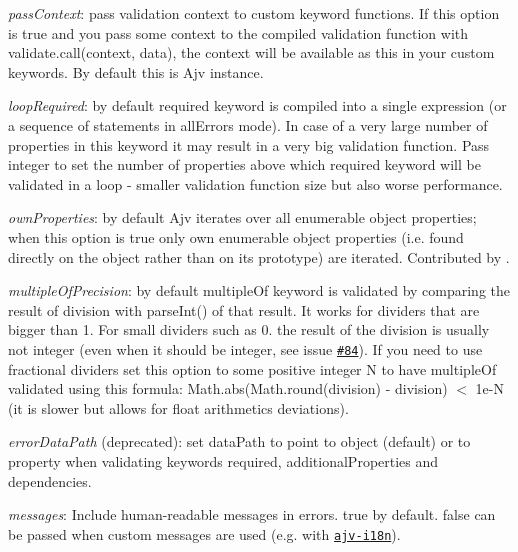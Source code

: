 \begin{DoxyItemize}
\begin{DoxyItemize}
\end{DoxyItemize}
\item {\itshape pass\+Context}\+: pass validation context to custom keyword functions. If this option is {\ttfamily true} and you pass some context to the compiled validation function with {\ttfamily validate.\+call(context, data)}, the {\ttfamily context} will be available as {\ttfamily this} in your custom keywords. By default {\ttfamily this} is Ajv instance.
\item {\itshape loop\+Required}\+: by default {\ttfamily required} keyword is compiled into a single expression (or a sequence of statements in {\ttfamily all\+Errors} mode). In case of a very large number of properties in this keyword it may result in a very big validation function. Pass integer to set the number of properties above which {\ttfamily required} keyword will be validated in a loop -\/ smaller validation function size but also worse performance.
\item {\itshape own\+Properties}\+: by default Ajv iterates over all enumerable object properties; when this option is {\ttfamily true} only own enumerable object properties (i.\+e. found directly on the object rather than on its prototype) are iterated. Contributed by .
\item {\itshape multiple\+Of\+Precision}\+: by default {\ttfamily multiple\+Of} keyword is validated by comparing the result of division with parse\+Int() of that result. It works for dividers that are bigger than 1. For small dividers such as 0. the result of the division is usually not integer (even when it should be integer, see issue \href{https://github.com/epoberezkin/ajv/issues/84}{\tt \#84}). If you need to use fractional dividers set this option to some positive integer N to have {\ttfamily multiple\+Of} validated using this formula\+: {\ttfamily Math.\+abs(Math.\+round(division) -\/ division) $<$ 1e-\/N} (it is slower but allows for float arithmetics deviations).
\item {\itshape error\+Data\+Path} (deprecated)\+: set {\ttfamily data\+Path} to point to \textquotesingle{}object\textquotesingle{} (default) or to \textquotesingle{}property\textquotesingle{} when validating keywords {\ttfamily required}, {\ttfamily additional\+Properties} and {\ttfamily dependencies}.
\item {\itshape messages}\+: Include human-\/readable messages in errors. {\ttfamily true} by default. {\ttfamily false} can be passed when custom messages are used (e.\+g. with \href{https://github.com/epoberezkin/ajv-i18n}{\tt ajv-\/i18n}).

\end{DoxyItemize}

